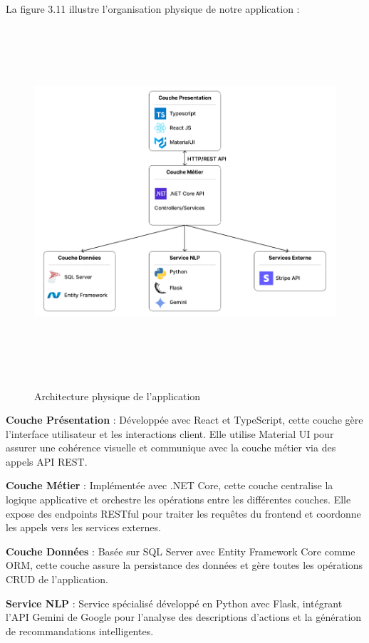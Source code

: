 \noindent La figure 3.11 illustre l'organisation physique de notre application :

\begin{figure}[H]
    \centering
    \includegraphics[width=16cm, height=13cm]{images/Architecturephysique.PNG}
    \label{fig:arch_physique}
    \caption{Architecture physique de l'application}
\end{figure}



\noindent\textbf{Couche Présentation} : Développée avec React et TypeScript, cette couche gère l'interface utilisateur et les interactions client. Elle utilise Material UI pour assurer une cohérence visuelle et communique avec la couche métier via des appels API REST.

\noindent \textbf{Couche Métier} : Implémentée avec .NET Core, cette couche centralise la logique applicative et orchestre les opérations entre les différentes couches. Elle expose des endpoints RESTful pour traiter les requêtes du frontend et coordonne les appels vers les services externes.

\noindent \textbf{Couche Données} : Basée sur SQL Server avec Entity Framework Core comme ORM, cette couche assure la persistance des données et gère toutes les opérations CRUD de l'application.

\noindent \textbf{Service NLP} : Service spécialisé développé en Python avec Flask, intégrant l'API Gemini de Google pour l'analyse des descriptions d'actions et la génération de recommandations intelligentes.


